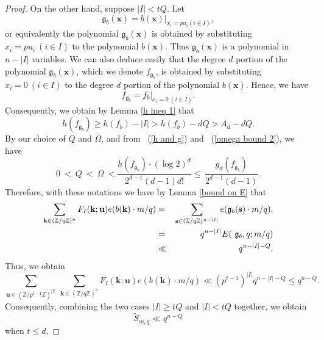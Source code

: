 \documentclass[12pt]{amsart}
\theoremstyle{definition}
\theoremstyle{remark}
\numberwithin{equation}{section}
\begin{document}
\begin{proof}
On the other hand, suppose  $|I| < t Q$.
Let
$$
\mathfrak{g}_b(\mathbf{x}) = {b}(\mathbf{x})|_{x_i = p u_i ( i \in I )},
$$
or equivalently the polynomial $\mathfrak{g}_b(\mathbf{x})$ is obtained by
substituting $x_i = p u_i \ (i \in I)$ to the polynomial ${b}(\mathbf{x})$.
Thus $\mathfrak{g}_b(\mathbf{x})$ is a polynomial in $n - |I|$ variables.
We can also deduce easily that the degree $d$ portion of the polynomial $\mathfrak{g}_b(\mathbf{x})$, which we denote
$f_{\mathfrak{g}_b}$, is obtained by substituting $x_i = 0 \ (i \in I)$ to the degree $d$ portion of the polynomial ${b}(\mathbf{x})$.
Hence, we have
$$
f_{\mathfrak{g}_b } =  {f_b} |_{x_i = 0 \ (i \in I)}.
$$
Consequently, we obtain by Lemma \ref{h ineq 1} that
$$
h(f_{\mathfrak{g}_b }) \geq h( {f_b}) - |I| > h( {f_b}) - dQ > A_d - dQ.
$$
By our choice of $Q$ and $\Omega$, and from ~(\ref{h and g}) and ~(\ref{omega bound 2}), we have
$$
0 \ < \ Q \ < \ \Omega \  < \frac{ h(f_{\mathfrak{g}_b}) \cdot (\log 2)^{d}}{ 2^{d-1} (d-1) d! }
\leq \  \frac{g_d( f_{\mathfrak{g}_b} )}{2^{d-1} (d-1) }.
$$
Therefore, with these notations we have by Lemma \ref{bound on E} that
\begin{eqnarray}
\sum_{\mathbf{k} \in (\mathbb{Z} / q \mathbb{Z})^n} F_I(\mathbf{k}; \mathbf{u}) e( {b}(\mathbf{k}) \cdot {m}/q )
&=& \sum_{\mathbf{s} \in (\mathbb{Z} / q \mathbb{Z})^{n - |I|}} e( \mathfrak{g}_b(\mathbf{s}) \cdot {m}/q ).
\notag
\\
&=& q^{n - |I|} E ( \ \mathfrak{g}_b,  q ;{m}/q )
\notag
\\
&\ll& q^{n - |I| - Q}.
\notag
\end{eqnarray}
Thus, we obtain
$$
\sum_{ \mathbf{u} \in  (\mathbb{Z} / p^{t-1} \mathbb{Z})^{|I|} } \
\sum_{\mathbf{k} \in (\mathbb{Z} / q \mathbb{Z})^n}
F_I(\mathbf{k}; \mathbf{u}) e(  {b}(\mathbf{k}) \cdot  {m}/q )
\ll (p^{t-1})^{|I|} q^{n - |I| - Q} \leq q^{n-Q}.
$$
Consequently, combining the two cases $|I| \geq tQ$ and $|I| < tQ$ together, we obtain
$$
\widetilde{S}_{ {m}, q} \ll q^{n-Q}
$$
when $t \leq d$.


\end{proof}
\end{document}
